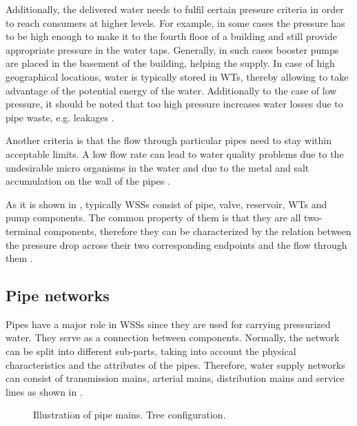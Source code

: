 \vspace{-3mm}

Additionally, the delivered water needs to fulfil certain pressure criteria in order to reach consumers at higher levels. For example, in some cases the pressure has to be high enough to make it to the fourth floor of a building and still provide appropriate pressure in the water taps. Generally, in such cases booster pumps are placed in the basement of the building, helping the supply. In case of high geographical locations, water is typically stored in WTs, thereby allowing to take advantage of the potential energy of the water. Additionally to the case of low pressure, it should be noted that too high pressure increases water losses due to pipe waste, e.g. leakages \cite{walski2003advanced}.

Another criteria is that the flow through particular pipes need to stay within acceptable limits. A low flow rate can lead to water quality problems due to the undesirable micro organisms in the water and due to the metal and salt accumulation on the wall of the pipes \cite{walski2003advanced}. 

As it is shown in , typically WSSs consist of pipe, valve, reservoir, WTs and pump components. The common property of them is that they are all two-terminal components, therefore they can be characterized by the relation between the pressure drop across their two corresponding endpoints and the flow through them \cite{master_aau}. 

\subsection{Pipe networks}
\label{pipe_networks}

Pipes have a major role in WSSs since they are used for carrying pressurized water. They serve as a connection between components. Normally, the network can be split into different sub-parts, taking into account the physical characteristics and the attributes of the pipes. Therefore, water supply networks can consist of transmission mains, arterial mains, distribution mains and service lines as shown in .

\begin{figure}[H]
\centering
 
\caption{Illustration of pipe mains. Tree configuration.}
\label{fig:pipemain_example}
\end{figure}

